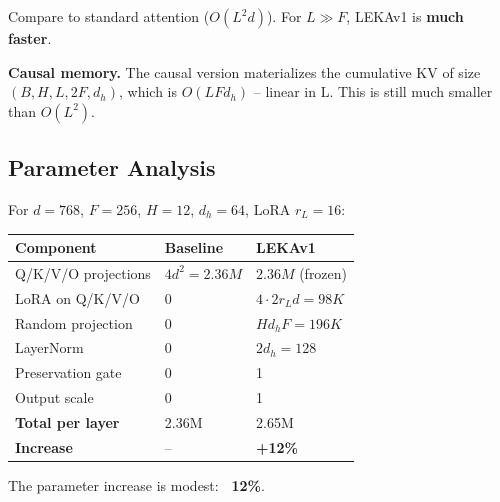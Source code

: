 Compare to standard attention ($O(L^2 d)$). For $L \gg F$, LEKAv1 is 
\textbf{much faster}.

\textbf{Causal memory.} The causal version materializes the cumulative KV 
of size $(B, H, L, 2F, d_h)$, which is $O(L F d_h)$ -- linear in L. 
This is still much smaller than $O(L^2)$.

\subsection{Parameter Analysis}

For $d = 768$, $F = 256$, $H = 12$, $d_h = 64$, LoRA $r_L = 16$:

\begin{table}[H]
\centering
\small
\begin{tabular}{lll}
\toprule
\textbf{Component} & \textbf{Baseline} & \textbf{LEKAv1} \\
\midrule
Q/K/V/O projections & $4 d^2 = 2.36M$ & $2.36M$ (frozen) \\
LoRA on Q/K/V/O & 0 & $4 \cdot 2 r_L d = 98K$ \\
Random projection & 0 & $H d_h F = 196K$ \\
LayerNorm & 0 & $2 d_h = 128$ \\
Preservation gate & 0 & 1 \\
Output scale & 0 & 1 \\
\textbf{Total per layer} & 2.36M & 2.65M \\
\textbf{Increase} & -- & \textbf{+12\%} \\
\bottomrule
\end{tabular}
\end{table}

The parameter increase is modest: \textbf{~12\%}.

